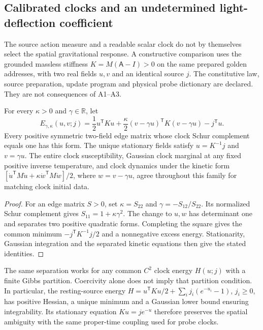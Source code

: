 \subsection{Calibrated clocks and an undetermined light-deflection coefficient}
\label{sec:paired-source-gravity}

The source action measure and a readable scalar clock do not by themselves
select the spatial gravitational response. A constructive comparison uses
the grounded massless stiffness $K=M(\mathsf A-I)>0$ on the same prepared
golden addresses, with two real fields $u,v$ and an identical source $j$.
The constitutive law, source preparation, update program and physical probe
dictionary are declared. They are not consequences of A1--A3.

\begin{proposition}
For every $\kappa>0$ and $\gamma\in\mathbb R$, let
\begin{equation}
 E_{\gamma,\kappa}(u,v;j)=\frac12 u^{\mathsf T}Ku
 +\frac\kappa2(v-\gamma u)^{\mathsf T}K(v-\gamma u)-j^{\mathsf T}u.
 \label{eq:paired-source-energy}
\end{equation}
Every positive symmetric two-field edge matrix whose clock Schur complement
equals one has this form. The unique stationary fields satisfy
$u=K^{-1}j$ and $v=\gamma u$. The entire clock susceptibility, Gaussian
clock marginal at any fixed positive inverse temperature, and clock
dynamics under the kinetic form
$[\dot u^{\mathsf T}M\dot u+\kappa\dot w^{\mathsf T}M\dot w]/2$,
where $w=v-\gamma u$, agree throughout this family for matching clock
initial data.
\end{proposition}
\begin{proof}
For an edge matrix $S>0$, set $\kappa=S_{22}$ and
$\gamma=-S_{12}/S_{22}$. Its normalized Schur complement gives
$S_{11}=1+\kappa\gamma^2$. The change to $u,w$ has determinant one and
separates two positive quadratic forms. Completing the square gives the
common minimum $-j^{\mathsf T}K^{-1}j/2$ and a nonnegative excess energy.
Stationarity, Gaussian integration and the separated kinetic equations
then give the stated identities.
\end{proof}

The same separation works for any common $C^2$ clock energy $H(u;j)$ with
a finite Gibbs partition. Coercivity alone does not imply that partition
condition. In particular, the resting-source energy
$H=u^{\mathsf T}Ku/2+\sum_i j_i(e^{-u_i}-1)$, $j_i\ge0$, has positive
Hessian, a unique minimum and a Gaussian lower bound ensuring integrability.
Its stationary equation $Ku=j e^{-u}$ therefore preserves the spatial
ambiguity with the same proper-time coupling used for probe clocks.

